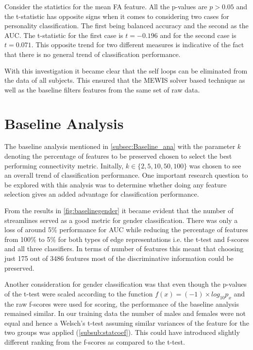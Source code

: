 \documentclass[msthesis.tex]{subfiles}
\begin{document}
Consider the statistics for the mean FA feature. All the p-values are $p>0.05$ and the t-statistic has opposite signs when it comes to considering two cases for personality classification. The first being balanced accuracy and the second as the \gls{AUC}. The t-statistic for the first case is $t=-0.196$ and for the second case is $t=0.071$. This opposite trend for two different  measures is indicative of the fact that there is no general trend of classification performance. 

With this investigation it became clear that the self loops can be eliminated from the data of all subjects. This ensured that the \gls{MEWIS} solver based technique as well as the baseline filters features from the same set of raw data.

\section{Baseline Analysis}
\label{res:baseline}

The baseline analysis mentioned in \autoref{subsec:Baseline_ana} with the parameter $k$ denoting the percentage of features to be preserved chosen to select the best performing connectivity metric. Initally, $k \in \{2,5,10,50,100\}$ was chosen to see an overall trend of classification performance. One important research question to be explored with this analysis was to determine whether doing any feature selection gives an added advantage for classification performance.

From  the results in \cref{fig:baselinegender}  it became evident that the number of streamlines served as a good metric for gender classification. There was only a loss of around 5\% performance for \gls{AUC} while reducing the percentage of features from 100\% to 5\% for both types of edge representations i.e. the t-test and f-scores and all three classifiers. In terms of number of features this meant that choosing just 175 out of 3486 features most of the discriminative information could be preserved.

Another consideration for gender classification was that even though the p-values of the t-test were scaled according to the function $f(x)= (-1) \times log_{10} p_{x}$ and the raw f-scores were used for scoring, the performance of the baseline analysis remained similar. In our training data the number of males and females were not equal and hence a Welsch's t-test assuming similar variances of the feature for the two groups was applied (\autoref{subsub:statcoef}). This could have introduced slightly different ranking from the f-scores as compared to the t-test.
\end{document}
